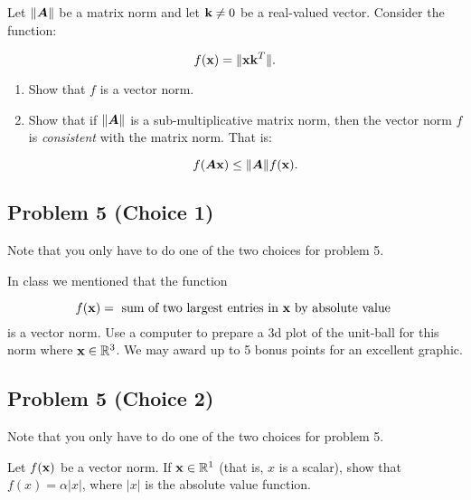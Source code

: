 \documentclass{article}
\begin{document}
Let $\|\boldsymbol{A}\|$ be a matrix norm and let $\boldsymbol{\mathrm{k}} \not= 0$ be a real-valued vector. Consider the function:

\begin{displaymath}
f(\boldsymbol{\mathrm{x}}) = \| \boldsymbol{\mathrm{x}} \boldsymbol{\mathrm{k}}^T \|.
\end{displaymath}
\begin{enumerate}%
\item Show that $f$ is a vector norm.


\item Show that if $\|\boldsymbol{A}\|$ is a sub-multiplicative matrix norm, then the vector norm $f$ is \emph{consistent} with the matrix norm. That is:

\begin{displaymath}
f(\boldsymbol{A} \boldsymbol{\mathrm{x}}) \le \|\boldsymbol{A}\| f(\boldsymbol{\mathrm{x}}).
\end{displaymath}


\end{enumerate}
\hypertarget{problem_5_choice_1_7}{}\subsection*{{Problem 5 (Choice 1)}}\label{problem_5_choice_1_7}

Note that you only have to do one of the two choices for problem 5.

In class we mentioned that the function

\begin{displaymath}
f(\boldsymbol{\mathrm{x}}) = \text{ sum of two largest entries in $\boldsymbol{\mathrm{x}}$ by absolute value }
\end{displaymath}
is a vector norm. Use a computer to prepare a 3d plot of the unit-ball for this norm where $\boldsymbol{\mathrm{x}} \in \mathbb{R}^{3}$. We may award up to 5 bonus points for an excellent graphic.

\hypertarget{problem_5_choice_2_8}{}\subsection*{{Problem 5 (Choice 2)}}\label{problem_5_choice_2_8}

Note that you only have to do one of the two choices for problem 5.

Let $f(\boldsymbol{\mathrm{x}})$ be a vector norm. If $\boldsymbol{\mathrm{x}} \in \mathbb{R}^{1}$ (that is, $x$ is a scalar), show that $f(x) = \alpha |x|$, where $|x|$ is the absolute value function.
\end{document}
